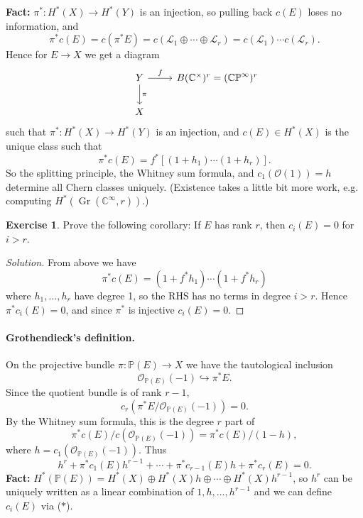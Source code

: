 \documentclass{article}
\theoremstyle{definition}
\newtheorem*{exercise}{Exercise}
\DeclareMathOperator{\Gr}{Gr}
\renewcommand{\L}{\mathcal{L}}
\renewcommand{\O}{\mathcal{O}}
\newcommand{\CP}{\mathbb{CP}}
\renewcommand{\P}{\mathbb{P}}
\newcommand{\C}{\mathbb{C}}
\begin{document}
\textbf{Fact:} $\pi^*:H^*(X)\to H^*(Y)$ is an injection, so pulling back $c(E)$
loses no information, and
\begin{equation*}
    \pi^*c(E) = c(\pi^*E) = c(\L_1\oplus\cdots\oplus\L_r)
        = c(\L_1)\cdots c(\L_r).
\end{equation*}
Hence for $E\to X$ we get a diagram
\begin{equation*}
    \begin{tikzcd}
        &Y \ar[r,"f"] \ar[d,"\pi"] &B(\C^\times)^r = (\CP^\infty)^r \\
        &X
    \end{tikzcd}
\end{equation*}
such that $\pi^*:H^*(X)\to H^*(Y)$ is an injection, and $c(E)\in H^*(X)$ is the
unique class such that
\begin{equation*}
    \pi^*c(E) = f^*[(1+h_1)\cdots(1+h_r)].
\end{equation*}
So the splitting principle, the Whitney sum formula, and $c_1(\O(1))=h$
determine all Chern classes uniquely. (Existence takes a little bit more work,
e.g. computing $H^*(\Gr(\C^\infty,r))$.)

\begin{exercise}
    Prove the following corollary: If $E$ has rank $r$, then $c_i(E)=0$ for
    $i>r$.
\end{exercise}

\begin{proof}[Solution]
    From above we have
    \begin{equation*}
        \pi^*c(E) = (1+f^*h_1)\cdots(1+f^*h_r)
    \end{equation*}
    where $h_1,\ldots,h_r$ have degree 1, so the RHS has no terms in degree
    $i>r$. Hence $\pi^*c_i(E)=0$, and since $\pi^*$ is injective $c_i(E)=0$.
\end{proof}

\paragraph{Grothendieck's definition.}
On the projective bundle $\pi:\P(E)\to X$ we have the tautological inclusion
\begin{equation*}
    \O_{\P(E)}(-1) \hookrightarrow \pi^*E.
\end{equation*}
Since the quotient bundle is of rank $r-1$,
\begin{equation*}
    c_r(\pi^*E/\O_{\P(E)}(-1)) = 0.
\end{equation*}
By the Whitney sum formula, this is the degree $r$ part of
\begin{equation*}
    \pi^*c(E)/c(\O_{\P(E)}(-1)) = \pi^*c(E)/(1-h),
\end{equation*}
where $h=c_1(\O_{\P(E)}(-1))$. Thus
\begin{equation*}
    h^r + \pi^*c_1(E)h^{r-1} + \cdots + \pi^*c_{r-1}(E)h + \pi^*c_r(E) = 0.
        \tag{$*$}
\end{equation*}
\textbf{Fact:} $H^*(\P(E))
=H^*(X)\oplus H^*(X)h\oplus\cdots\oplus H^*(X)h^{r-1}$, so $h^r$ can be uniquely
written as a linear combination of $1,h,\ldots,h^{r-1}$ and we can define
$c_i(E)$ via ($*$).
\end{document}
